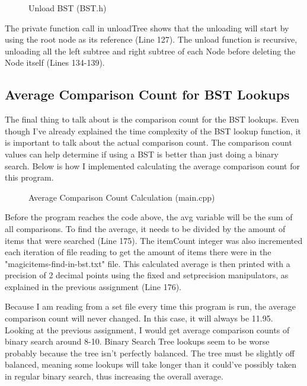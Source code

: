 \documentclass[letterpaper, 10pt]{article}
\begin{document}
\vspace{-3em}

\begin{figure}[H]
  \centering
   
  \caption{Unload BST (BST.h)}
  \label{fig:figure3.13-part2}
\end{figure}

\noindent
The private function call in unloadTree shows that the unloading will start by using the root node as its reference (Line 127). The unload function is recursive, unloading all the left subtree and right subtree of each Node before deleting the Node itself (Lines 134-139).

\subsection{Average Comparison Count for BST Lookups}
\noindent
The final thing to talk about is the comparison count for the BST lookups. Even though I've already explained the time complexity of the BST lookup function, it is important to talk about the actual comparison count. The comparison count values can help determine if using a BST is better than just doing a binary search. Below is how I implemented calculating the average comparison count for this program.

\begin{figure}[H]
  \centering
   
  \caption{Average Comparison Count Calculation (main.cpp)}
  \label{fig:figure3.14}
\end{figure}

\noindent
Before the program reaches the code above, the avg variable will be the sum of all comparisons. To find the average, it needs to be divided by the amount of items that were searched (Line 175). The itemCount integer was also incremented each iteration of file reading to get the amount of items there were in the "magicitems-find-in-bst.txt" file. This calculated average is then printed with a precision of 2 decimal points using the fixed and setprecision manipulators, as explained in the previous assignment (Line 176). 

\vspace{1em}
\noindent
Because I am reading from a set file every time this program is run, the average comparison count will never changed. In this case, it will always be 11.95. Looking at the previous assignment, I would get average comparison counts of binary search around 8-10. Binary Search Tree lookups seem to be worse probably because the tree isn't perfectly balanced. The tree must be slightly off balanced, meaning some lookups will take longer than it could've possibly taken in regular binary search, thus increasing the overall average.
\end{document}

